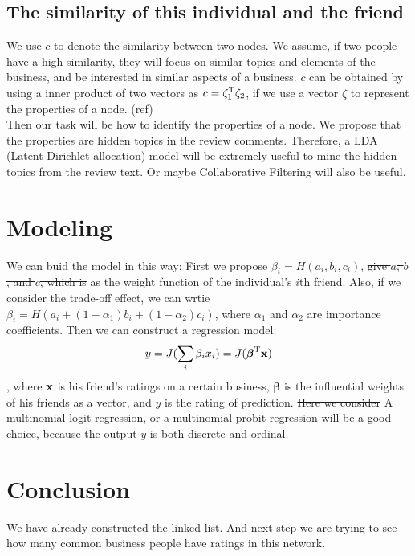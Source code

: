 \documentclass[11pt]{article} %
\newcommand{\Tr}{^{\rm T}}
\newcommand{\x}{{\bf x}}
\newcommand{\bbeta}{\boldsymbol{\beta}}
\newcommand{\1}{{\bf 1}}
\newcommand{\0}{{\bf 0}}
\begin{document}
\subsection{The similarity of this individual and the friend}
We use $ c $ to denote the similarity between two nodes. We assume, if two people have a high similarity, they will focus on similar topics and elements of the business, and be interested in similar aspects of a business. $ c $ can be obtained by using a inner product of two vectors as $ c=\zeta_{1} \Tr\zeta_{2} $, if we use a vector $ \zeta $ to represent the properties of a node. (ref)\\

Then our task will be how to identify the properties of a node. We propose that the properties are hidden topics in the review comments. Therefore, a LDA (Latent Dirichlet allocation) model will be extremely useful to mine the hidden topics from the review text. Or maybe Collaborative Filtering will also be useful.

\section{Modeling}
We can buid the model in this way: First we propose $ \beta_{i}=H(a_{i}, b_{i}, c_{i}) $, \sout{give $ a $, $ b $, and $ c $, which is} as the weight function of the individual's $ i $th friend. Also, if we consider the trade-off effect, we can wrtie $ \beta_{i}=H(a_{i}+(1-\alpha_{1})b_{i}+(1-\alpha_{2})c_{i}) $, where $ \alpha_{1} $ and $ \alpha_{2} $ are importance coefficients. Then we can construct a regression model: $$ y= J(\sum\limits_{i}\beta_{i}x_{i})=J(\bbeta\Tr\x)$$, where $ \x $ is his friend's ratings on a certain business, $ \bbeta $ is the influential weights of his friends as a vector, and $ y $ is the rating of prediction. \sout{Here we consider} A multinomial logit regression, or a multinomial probit regression will be a good choice, because the output $ y $ is both discrete and ordinal.

\section{Conclusion}
We have already constructed the linked list. And next step we are trying to see how many common business people have ratings in this network.




\end{document}
